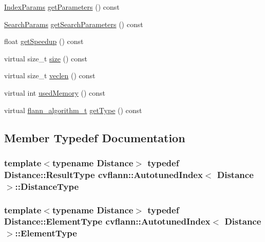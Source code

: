\begin{DoxyCompactItemize}
\item 
\hyperlink{namespacecvflann_a742b4c7076c21012054af74a9ee48289}{Index\-Params} \hyperlink{classcvflann_1_1AutotunedIndex_a026442092c6d822042c325dd1da4e3f4}{get\-Parameters} () const 
\item 
\hyperlink{structcvflann_1_1SearchParams}{Search\-Params} \hyperlink{classcvflann_1_1AutotunedIndex_a9126bbdaee0a4ace0c843ac238919e79}{get\-Search\-Parameters} () const 
\item 
float \hyperlink{classcvflann_1_1AutotunedIndex_aab6f87953c3045bdb23d30b479c30a91}{get\-Speedup} () const 
\item 
virtual size\-\_\-t \hyperlink{classcvflann_1_1AutotunedIndex_ace7b8a8b15394241ffde821ec034cc7f}{size} () const 
\item 
virtual size\-\_\-t \hyperlink{classcvflann_1_1AutotunedIndex_aad8c5c2a8c18c86752840d7e1ff95cdc}{veclen} () const 
\item 
virtual int \hyperlink{classcvflann_1_1AutotunedIndex_ae1b1a921b5b7e278b15b33ebd215d1cb}{used\-Memory} () const 
\item 
virtual \hyperlink{namespacecvflann_a4e3e6c98d774ea77fd7f0045c9bc7817}{flann\-\_\-algorithm\-\_\-t} \hyperlink{classcvflann_1_1AutotunedIndex_a87c161d647b564a15a2f18b3295ce6be}{get\-Type} () const 
\end{DoxyCompactItemize}


\subsection{Member Typedef Documentation}
\hypertarget{classcvflann_1_1AutotunedIndex_af9e75c21685cbb82c25e5c3a254a9b5e}{
\subsubsection[{Distance\-Type}]{\setlength{\rightskip}{0pt plus 5cm}template$<$typename Distance$>$ typedef Distance\-::\-Result\-Type {\bf cvflann\-::\-Autotuned\-Index}$<$ Distance $>$\-::{\bf Distance\-Type}}}\label{classcvflann_1_1AutotunedIndex_af9e75c21685cbb82c25e5c3a254a9b5e}
\hypertarget{classcvflann_1_1AutotunedIndex_a127e9c73fbe6846733e1d0e5bbab1122}{
\subsubsection[{Element\-Type}]{\setlength{\rightskip}{0pt plus 5cm}template$<$typename Distance$>$ typedef Distance\-::\-Element\-Type {\bf cvflann\-::\-Autotuned\-Index}$<$ Distance $>$\-::{\bf Element\-Type}}}\label{classcvflann_1_1AutotunedIndex_a127e9c73fbe6846733e1d0e5bbab1122}



